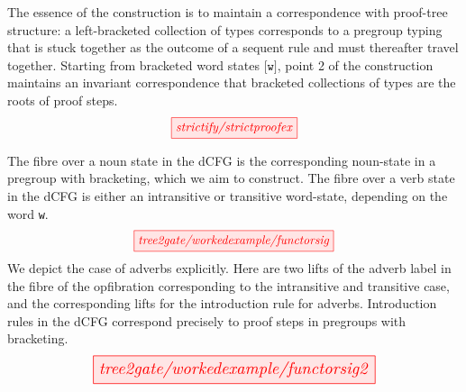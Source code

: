 \begin{example}
The essence of the construction is to maintain a correspondence with proof-tree structure: a left-bracketed collection of types corresponds to a pregroup typing that is stuck together as the outcome of a sequent rule and must thereafter travel together. Starting from bracketed word states $\texttt{[w]}$, point 2 of the construction maintains an invariant correspondence that bracketed collections of types are the roots of proof steps.
\[\tikzfig{strictify/strictproofex}\]
\end{example}

\begin{myboxR}
\begin{construction}\label{cons:pg2cfg} The fibre over a noun state in the dCFG is the corresponding noun-state in a pregroup with bracketing, which we aim to construct. The fibre over a verb state in the dCFG is either an intransitive or transitive word-state, depending on the word \texttt{w}.
\[\resizebox{0.5\textwidth}{!}{\tikzfig{tree2gate/workedexample/functorsig}}\]
We depict the case of adverbs explicitly. Here are two lifts of the adverb label in the fibre of the opfibration corresponding to the intransitive and transitive case, and the corresponding lifts for the introduction rule for adverbs. Introduction rules in the dCFG correspond precisely to proof steps in pregroups with bracketing.
\[\resizebox{0.7\textwidth}{!}{\tikzfig{tree2gate/workedexample/functorsig2}}\]
\end{construction}
\end{myboxR}

